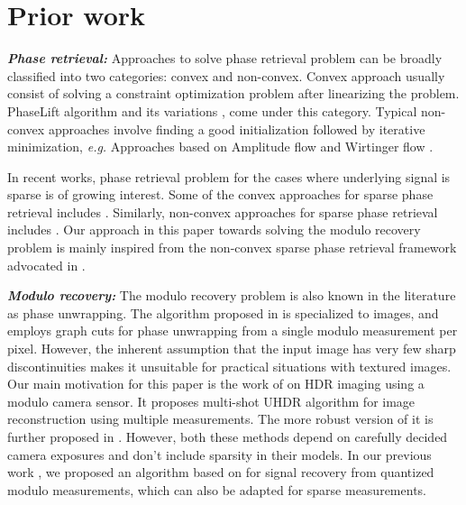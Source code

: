 \section{Prior work}
\label{sec:prior}

\emph{\textbf{Phase retrieval:}} Approaches to solve phase retrieval problem can be broadly classified into two categories: convex and non-convex. 
Convex approach usually consist of solving a constraint optimization problem after linearizing the problem. PhaseLift algorithm \cite{candes2013phaselift} and its variations \cite{gross2017improved}, \cite{candes2015phasediff} come under this category. Typical non-convex approaches involve finding a good initialization followed by iterative minimization, \textit{e.g.} Approaches based on Amplitude flow \cite{wang2016sparse,wang2016solving} and Wirtinger flow \cite{candes2015phase, zhang2016reshaped,  chen2015solving, cai2016optimal}.

In recent works, phase retrieval problem for the cases where underlying signal is sparse is of growing interest. Some of the convex approaches for sparse phase retrieval includes \cite{ohlsson2012cprl, li2013sparse,bahmani2015efficient,jaganathan2012recovery}. Similarly, non-convex approaches for sparse phase retrieval includes \cite{netrapalli2013phase, cai2016optimal, wang2016sparse}. Our approach in this paper towards solving the modulo recovery problem is mainly inspired from the non-convex sparse phase retrieval framework advocated in \cite{Jagatap2017}. 

\emph{\textbf{Modulo recovery:}} The modulo recovery problem is also known in the literature
as phase unwrapping. The algorithm proposed in \cite{bioucas2007phase} is specialized to images, and employs graph cuts for phase unwrapping from a single modulo measurement per pixel. However, the inherent assumption that the input image has very few sharp discontinuities makes it unsuitable for practical situations with textured images. Our main motivation for this paper is the work of \cite{ICCP15_Zhao} on HDR imaging using a modulo camera sensor. It proposes multi-shot UHDR algorithm for image reconstruction using multiple measurements. The more robust version of it is further proposed in \cite{Lang2017}. However, both these methods depend on carefully decided camera exposures and don't include sparsity in their models. In our previous work \cite{Shah}, we proposed an algorithm based on \cite{ICCP15_Zhao, soltani2017stable} for signal recovery from quantized modulo measurements, which can also be adapted for sparse measurements. 

